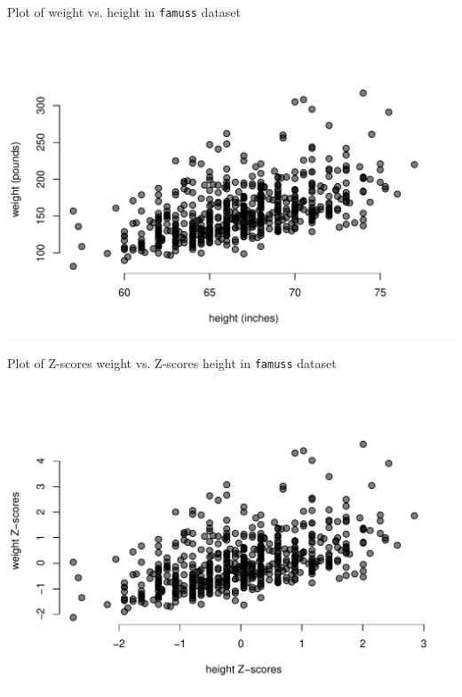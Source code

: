 \documentclass[10pt,handout]{beamer}\usepackage[]{graphicx}\usepackage[]{color}
\makeatletter
\def\maxwidth{ %
  \ifdim\Gin@nat@width>\linewidth
    \linewidth
  \else
    \Gin@nat@width
  \fi
}
\newenvironment{knitrout}{}{} %
\makeatother
\begin{document}
\begin{frame}[fragile]{Plot of weight vs. height in \texttt{famuss} dataset}
	
\begin{knitrout}\tiny
{}\color{fgcolor}

{\centering \includegraphics[width=\maxwidth]{figure/fam-plot-1} 

}


\end{knitrout}
	
\end{frame}


\begin{frame}[fragile]{Plot of Z-scores weight vs. Z-scores height in \texttt{famuss} dataset}

\begin{knitrout}\tiny
{}\color{fgcolor}

{\centering \includegraphics[width=\maxwidth]{figure/zfam-plot-1} 

}


\end{knitrout}

\end{frame}
\end{document}
